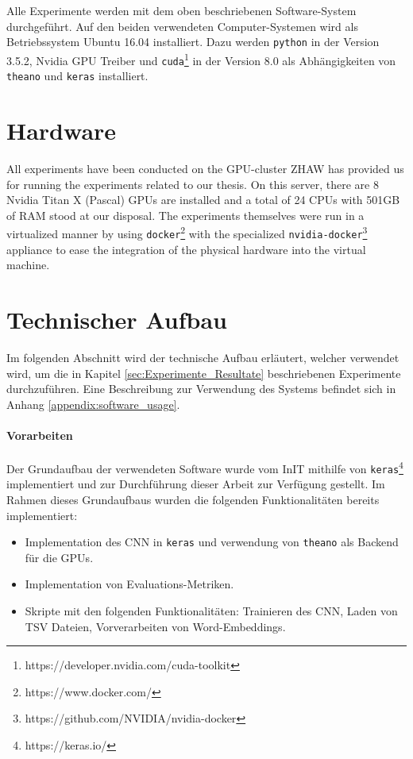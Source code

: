 Alle Experimente werden mit dem oben beschriebenen Software-System durchgeführt. Auf den beiden verwendeten Computer-Systemen wird als Betriebssystem Ubuntu 16.04 installiert. Dazu werden \texttt{python} in der Version 3.5.2, Nvidia GPU Treiber und \texttt{cuda}\footnote{https://developer.nvidia.com/cuda-toolkit} in der Version 8.0 als Abhängigkeiten von \texttt{theano} und \texttt{keras} installiert.

\section{Hardware}
All experiments have been conducted on the GPU-cluster ZHAW has provided us for running the experiments related to our thesis. On this server, there are 8 Nvidia Titan X (Pascal) GPUs are installed and a total of 24 CPUs with 501GB of RAM stood at our disposal. The experiments themselves were run in a virtualized manner by using \texttt{docker}\footnote{https://www.docker.com/} with the specialized \texttt{nvidia-docker}\footnote{https://github.com/NVIDIA/nvidia-docker} appliance to ease the integration of the physical hardware into the virtual machine.

\iffalse
\section{Technischer Aufbau}
\label{technical_setup}
Im folgenden Abschnitt wird der technische Aufbau erläutert, welcher verwendet wird, um die in Kapitel \ref{sec:Experimente_Resultate} beschriebenen Experimente durchzuführen. Eine Beschreibung zur Verwendung des Systems befindet sich in Anhang \ref{appendix:software_usage}.

\paragraph{Vorarbeiten}
\label{technichal_setup:prework}
Der Grundaufbau der verwendeten Software wurde vom InIT mithilfe von \texttt{keras}\footnote{https://keras.io/} implementiert und zur Durchführung dieser Arbeit zur Verfügung gestellt. Im Rahmen dieses Grundaufbaus wurden die folgenden Funktionalitäten bereits implementiert:

\begin{itemize}[noitemsep]
	\item Implementation des CNN in \texttt{keras} und verwendung von \texttt{theano} \cite{theanoCitShort} als Backend für die \gls{GPU}s.
	\item Implementation von Evaluations-Metriken.
	\item Skripte mit den folgenden Funktionalitäten: Trainieren des CNN, Laden von TSV Dateien, Vorverarbeiten von Word-Embeddings.
\end{itemize}

